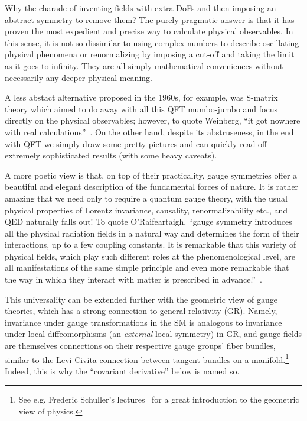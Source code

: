 Why the charade of inventing fields with extra DoFs and then imposing an abstract symmetry to remove them?
The purely pragmatic answer is that it has proven the most expedient and precise way to calculate physical observables.
In this sense, it is not so dissimilar to using complex numbers to describe oscillating physical phenomena or renormalizing by imposing a cut-off and taking the limit as it goes to infinity.
They are all simply mathematical conveniences without necessarily any deeper physical meaning.

A less abstact alternative proposed in the 1960s, for example, was S-matrix theory which aimed to do away with all this QFT mumbo-jumbo and focus directly on the physical observables; however, to quote Weinberg, ``it got nowhere with real calculations''~\cite{WeinbergCERNLecture}.
On the other hand, despite its abstruseness, in the end with QFT we simply draw some pretty pictures and can quickly read off extremely sophisticated results (with some heavy caveats).

A more poetic view is that, on top of their practicality, gauge symmetries offer a beautiful and elegant description of the fundamental forces of nature.
It is rather amazing that we need only to require a quantum \UU[1] gauge theory, with the usual physical properties of Lorentz invariance, causality, renormalizability etc., and QED naturally falls out!
To quote O'Raifeartaigh, ``gauge symmetry introduces all the physical radiation fields in a natural way and determines the form of their interactions, up to a few coupling constants.
It is remarkable that this variety of physical fields, which play such different roles at the phenomenological level, are all manifestations of the same simple principle and even more remarkable that the way in which they interact with matter is prescribed in advance.''~\cite{ORaifeartaigh:1997dvq}.

This universality can be extended further with the geometric view of gauge theories, which has a strong connection to general relativity (GR).
Namely, invariance under gauge transformations in the SM is analogous to invariance under local diffeomorphisms (an \textit{external} local symmetry) in GR, and gauge fields are themselves connections on their respective gauge groups' fiber bundles, similar to the Levi-Civita connection between tangent bundles on a manifold.\footnote{See e.g. Frederic Schuller's lectures~\cite{SchullerGATP} for a great introduction to the geometric view of physics.}
Indeed, this is why the ``covariant derivative'' below is named so.

